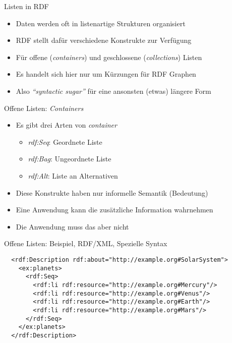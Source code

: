 \documentclass{beamer}
\begin{document}
\begin{frame}{Listen in RDF}
	
	\begin{itemize}
		\item Daten werden oft in listenartige Strukturen organisiert
		\item RDF stellt dafür verschiedene Konstrukte zur Verfügung
		\item Für offene (\emph{containers}) und geschlossene (\emph{collections}) Listen
		\item Es handelt sich hier nur um Kürzungen für RDF Graphen
		\item Also \emph{``syntactic sugar''} für eine ansonsten (etwas) längere Form
	\end{itemize}
	
\end{frame}

\begin{frame}{Offene Listen: \emph{Containers}}
	
	\begin{itemize}
		\item Es gibt drei Arten von \emph{container}
		\begin{itemize}
			\item \emph{rdf:Seq}: Geordnete Liste
			\item \emph{rdf:Bag}: Ungeordnete Liste
			\item \emph{rdf:Alt}: Liste an Alternativen
		\end{itemize}
		\item Diese Konstrukte haben nur informelle Semantik (Bedeutung)
 		\item Eine Anwendung kann die zusätzliche Information wahrnehmen
 		\item Die Anwendung muss das aber nicht
	\end{itemize}
	
\end{frame}

\begin{frame}[fragile]{Offene Listen: Beispiel, RDF/XML, Spezielle Syntax}
	
	\small
	\begin{lstlisting}	
  <rdf:Description rdf:about="http://example.org#SolarSystem">
    <ex:planets>
      <rdf:Seq>
        <rdf:li rdf:resource="http://example.org#Mercury"/>
        <rdf:li rdf:resource="http://example.org#Venus"/>
        <rdf:li rdf:resource="http://example.org#Earth"/>
        <rdf:li rdf:resource="http://example.org#Mars"/>
      </rdf:Seq>
    </ex:planets>
  </rdf:Description>
	\end{lstlisting}
	
\end{frame}
\end{document}
